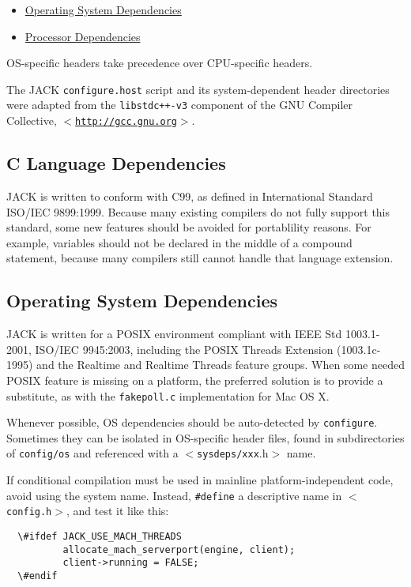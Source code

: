 \begin{itemize}
\item \hyperlink{porting-guide_portopsys}{Operating System Dependencies}\item \hyperlink{porting-guide_portcpu}{Processor Dependencies}\end{itemize}


OS-specific headers take precedence over CPU-specific headers.

The JACK {\tt configure.host} script and its system-dependent header directories were adapted from the {\tt libstdc++-v3} component of the GNU Compiler Collective, $<$\href{http://gcc.gnu.org}{\tt http://gcc.gnu.org}$>$.\hypertarget{porting-guide_portlang}{}\subsection{C Language Dependencies}\label{porting-guide_portlang}
JACK is written to conform with C99, as defined in International Standard ISO/IEC 9899:1999. Because many existing compilers do not fully support this standard, some new features should be avoided for portablility reasons. For example, variables should not be declared in the middle of a compound statement, because many compilers still cannot handle that language extension.\hypertarget{porting-guide_portopsys}{}\subsection{Operating System Dependencies}\label{porting-guide_portopsys}
JACK is written for a POSIX environment compliant with IEEE Std 1003.1-2001, ISO/IEC 9945:2003, including the POSIX Threads Extension (1003.1c-1995) and the Realtime and Realtime Threads feature groups. When some needed POSIX feature is missing on a platform, the preferred solution is to provide a substitute, as with the {\tt fakepoll.c} implementation for Mac OS X.

Whenever possible, OS dependencies should be auto-detected by {\tt configure}. Sometimes they can be isolated in OS-specific header files, found in subdirectories of {\tt config/os} and referenced with a {\tt $<$sysdeps/xxx}.h$>$ name.

If conditional compilation must be used in mainline platform-independent code, avoid using the system name. Instead, {\tt \#define} a descriptive name in {\tt $<$config.h$>$}, and test it like this:



\footnotesize\begin{verbatim}  \#ifdef JACK_USE_MACH_THREADS
          allocate_mach_serverport(engine, client);
          client->running = FALSE;
  \#endif
\end{verbatim}
\normalsize


